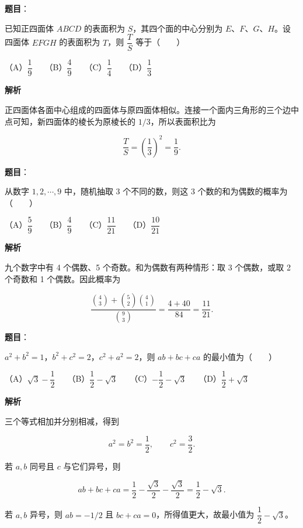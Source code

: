 \begin{answer}

\textbf{题目}：

已知正四面体 $ABCD$ 的表面积为 $S$，其四个面的中心分别为 $E\text{、}F\text{、}G\text{、}H$。设四面体 $EFGH$ 的表面积为 $T$，则 $\dfrac TS$ 等于\mbox{（　　）}

（A）$\dfrac19$　　（B）$\dfrac49$　　（C）$\dfrac14$　　（D）$\dfrac13$

\textbf{解析}

正四面体各面中心组成的四面体与原四面体相似。连接一个面内三角形的三个边中点可知，新四面体的棱长为原棱长的 $1/3$，所以表面积比为

\nopagebreak[4]
\[
\frac TS=\left(\frac13\right)^2=\frac19.
\]


\end{answer}
\begin{answer}

\textbf{题目}：

从数字 $1,2,\cdots,9$ 中，随机抽取 3 个不同的数，则这 3 个数的和为偶数的概率为\mbox{（　　）}

（A）$\dfrac59$　　（B）$\dfrac49$　　（C）$\dfrac{11}{21}$　　（D）$\dfrac{10}{21}$

\textbf{解析}

九个数字中有 4 个偶数、5 个奇数。和为偶数有两种情形：取 3 个偶数，或取 2 个奇数和 1 个偶数。因此概率为

\nopagebreak[4]
\[
\frac{\binom43+\binom52\binom41}{\binom93}
=\frac{4+40}{84}
=\frac{11}{21}.
\]


\end{answer}
\begin{answer}

\textbf{题目}：

$a^2+b^2=1$，$b^2+c^2=2$，$c^2+a^2=2$，则 $ab+bc+ca$ 的最小值为\mbox{（　　）}

（A）$\sqrt3-\dfrac12$　　（B）$\dfrac12-\sqrt3$　　（C）$-\dfrac12-\sqrt3$　　（D）$\dfrac12+\sqrt3$

\textbf{解析}

三个等式相加并分别相减，得到

\nopagebreak[4]
\[
a^2=b^2=\frac12,\qquad c^2=\frac32.
\]

若 $a,b$ 同号且 $c$ 与它们异号，则

\nopagebreak[4]
\[
ab+bc+ca=\frac12-\frac{\sqrt3}{2}-\frac{\sqrt3}{2}
=\frac12-\sqrt3.
\]

若 $a,b$ 异号，则 $ab=-1/2$ 且 $bc+ca=0$，所得值更大，故最小值为 $\dfrac12-\sqrt3$。


\end{answer}
